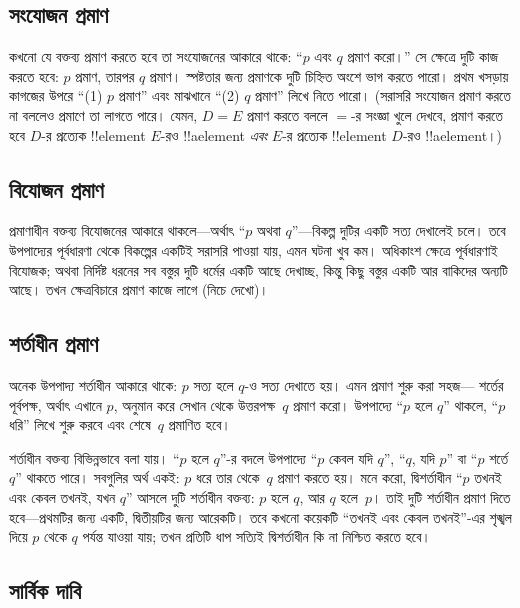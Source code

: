 \documentclass[../../../include/open-logic-section]{subfiles}
\begin{document}
\subsection{সংযোজন প্রমাণ}

কখনো যে বক্তব্য প্রমাণ করতে হবে তা সংযোজনের আকারে
থাকে: ``$p$ এবং $q$ প্রমাণ করো।'' সে ক্ষেত্রে দুটি
কাজ করতে হবে: $p$ প্রমাণ, তারপর $q$ প্রমাণ।
স্পষ্টতার জন্য প্রমাণকে দুটি চিহ্নিত অংশে ভাগ করতে পারো।
প্রথম খসড়ায় কাগজের উপরে ``(1) $p$ প্রমাণ'' এবং
মাঝখানে ``(2) $q$ প্রমাণ'' লিখে নিতে পারো। (সরাসরি
সংযোজন প্রমাণ করতে না বললেও প্রমাণে তা লাগতে পারে।
যেমন, $D = E$ প্রমাণ করতে বললে $=$-র সংজ্ঞা খুলে
দেখবে, প্রমাণ করতে হবে $D$-র প্রত্যেক !!{element}
$E$-রও !!a{element} \emph{এবং} $E$-র প্রত্যেক
!!{element} $D$-রও !!a{element}।)

\subsection{বিযোজন প্রমাণ}

প্রমাণাধীন বক্তব্য বিযোজনের আকারে থাকলে—অর্থাৎ
``$p$ অথবা $q$''—বিকল্প দুটির একটি সত্য দেখালেই
চলে। তবে উপপাদ্যের পূর্বধারণা থেকে বিকল্পের একটিই
সরাসরি পাওয়া যায়, এমন ঘটনা খুব কম। অধিকাংশ ক্ষেত্রে
পূর্বধারণাই বিযোজক; অথবা নির্দিষ্ট ধরনের সব বস্তুর
দুটি ধর্মের একটি আছে দেখাচ্ছ, কিন্তু কিছু বস্তুর একটি
আর বাকিদের অন্যটি আছে। তখন ক্ষেত্রবিচারে প্রমাণ
কাজে লাগে (নিচে দেখো)।

\subsection{শর্তাধীন প্রমাণ}

অনেক উপপাদ্য শর্তাধীন আকারে থাকে: $p$ সত্য হলে
$q$-ও সত্য দেখাতে হয়। এমন প্রমাণ শুরু করা সহজ—
শর্তের পূর্বপক্ষ, অর্থাৎ এখানে $p$, অনুমান করে
সেখান থেকে উত্তরপক্ষ~$q$ প্রমাণ করো। উপপাদ্যে
``$p$ হলে $q$'' থাকলে, ``$p$ ধরি'' লিখে শুরু করবে
এবং শেষে~$q$ প্রমাণিত হবে।

শর্তাধীন বক্তব্য বিভিন্নভাবে বলা যায়। ``$p$ হলে
$q$''-র বদলে উপপাদ্যে ``$p$ কেবল যদি $q$'',
``$q$, যদি $p$'' বা ``$p$ শর্তে $q$'' থাকতে পারে।
সবগুলির অর্থ একই: $p$ ধরে তার থেকে~$q$ প্রমাণ
করতে হয়। মনে করো, দ্বিশর্তাধীন ``$p$ তখনই এবং
কেবল তখনই, যখন $q$'' আসলে দুটি শর্তাধীন বক্তব্য:
$p$ হলে $q$, আর $q$ হলে~$p$। তাই দুটি
শর্তাধীন প্রমাণ দিতে হবে—প্রথমটির জন্য একটি,
দ্বিতীয়টির জন্য আরেকটি। তবে কখনো কয়েকটি
``তখনই এবং কেবল তখনই''-এর শৃঙ্খল দিয়ে $p$
থেকে $q$ পর্যন্ত যাওয়া যায়; তখন প্রতিটি ধাপ
সত্যিই দ্বিশর্তাধীন কি না নিশ্চিত করতে হবে।

\subsection{সার্বিক দাবি}
\end{document}

